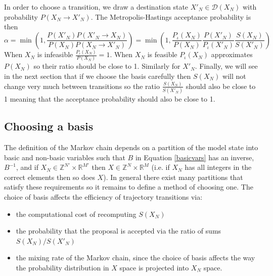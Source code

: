 \documentclass{article}
\begin{document}
In order to choose a transition, we draw a destination state $X'_N \in \mathcal{D}(X_N)$ with probability $P(X_N \to X'_N)$. The Metropolis-Hastings acceptance probability is then
\[
\alpha = 
\min\left( 1, \frac{P(X'_N)P(X'_N \to X_N)}{P(X_N)P(X_N \to X'_N)} \right) = \min\left(1, 
\frac{P_\iota(X_N)}{P(X_N)} \frac{P(X'_N)}{P_\iota(X'_N)}  \frac{S(X_N)}{S(X'_N)}\right)
\]
When $X_N$ is infeasible $\frac{P_\iota(X_N)}{P(X_N)} = 1$. When $X_N$ is feasible $P_\iota(X_N)$ approximates $P(X_N)$ so their ratio should be close to 1. Similarly for $X'_N$. Finally, we will see in the next section that if we choose the basis carefully then $S(X_N)$ will not change very much between transitions so the ratio $ \frac{S(X_N)}{S(X'_N)}$ should also be close to 1 meaning that the acceptance probability should also be close to 1.

\subsection{Choosing a basis}
\label{basis}
The definition of the Markov chain depends on a partition of the model state into basic and non-basic variables such that $B$ in Equation \eqref{basicvars} has an inverse, $B^{-1}$, and if $X_N \in \mathbb{Z}^{N'} \times \mathbb{R}^{M'}$ then $X \in \mathbb{Z}^{N} \times \mathbb{R}^{M}$ (i.e. if $X_N$ has all integers in the correct elements then so does $X$). In general there exist many partitions that satisfy these requirements so it remains to define a method of choosing one. The choice of basis affects the efficiency of trajectory transitions via:
\begin{itemize}
\item the computational cost of recomputing $S(X_N)$

\item the probability that the proposal is accepted via the ratio of sums $S(X_N)/S(X'_N)$

\item the mixing rate of the Markov chain, since the choice of basis affects the way the probability distribution in $X$ space is projected into $X_N$ space.
\end{itemize}
\end{document}
